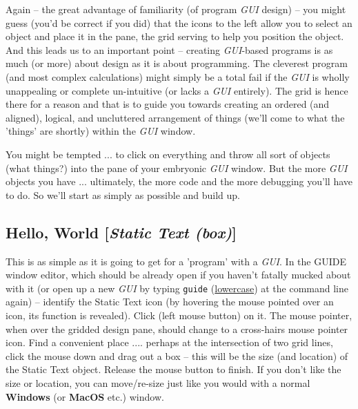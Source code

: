 \documentclass{tufte-book} %
\begin{document}
Again -- the great advantage of familiarity (of program \textit{GUI} design) -- you might guess (you'd be correct if you did) that the icons to the left allow you to select an object and place it in the pane, the grid serving to help you position the object. And this leads us to an important point -- creating \textit{GUI}-based programs is as much (or more) about design as it is about programming. The cleverest program (and most complex calculations) might simply be a total fail if the \textit{GUI} is wholly unappealing or complete un-intuitive (or lacks a \textit{GUI} entirely). The grid is hence there for a reason and that is to guide you towards creating an ordered (and aligned), logical, and uncluttered arrangement of things (we'll come to what the 'things' are shortly) within the \textit{GUI} window.

You might be tempted ... to click on everything and throw all sort of objects (what things?) into the pane of your embryonic \textit{GUI} window. But the more \textit{GUI} objects you have ... ultimately, the more code and the more debugging you'll have to do. So we'll start as simply as possible and build up. 


\newpage 
\subsection{Hello, World [\textit{Static Text (box)}]}

This is as simple as it is going to get for a 'program' with a \textit{GUI}. In the \textsf{GUIDE window editor}, which should be already open if you haven't fatally mucked about with it (or open up a new \textit{GUI} by typing \texttt{guide} (\uline{lowercase}) at the command line again) -- identify the \textsf{Static Text} icon (by hovering the mouse pointed over an icon, its function is revealed). Click (\textsf{left mouse button}) on it. The mouse pointer, when over the gridded design pane, should change to a cross-hairs mouse pointer icon. Find a convenient place .... perhaps at the intersection of two grid lines, click the mouse down and drag out a box -- this will be the size (and location) of the \textsf{Static Text} object. Release the mouse button to finish. If you don't like the size or location, you can move/re-size just like you would with a normal \textbf{Windows} (or \textbf{MacOS} etc.) window.
\end{document}
